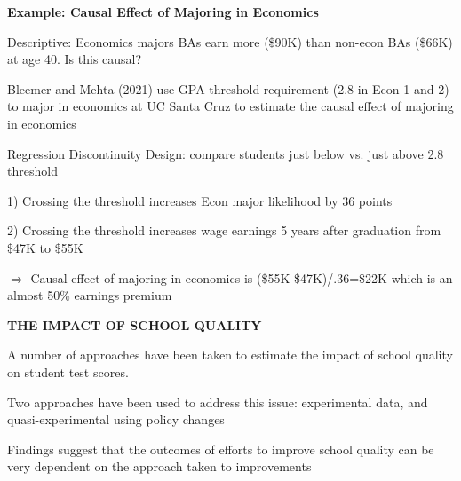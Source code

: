 \documentclass[landscape]{slides}
\begin{document}
\begin{slide}
\begin{center}
{\bf Example: Causal Effect of Majoring in Economics}
\end{center}
Descriptive: Economics majors BAs earn more (\$90K) than non-econ BAs (\$66K) at age 40. Is this causal?

Bleemer and Mehta (2021) use GPA threshold requirement (2.8 in Econ 1 and 2) to major in economics at UC Santa Cruz to
estimate the causal effect of majoring in economics

Regression Discontinuity Design: compare students just below vs. just above 2.8 threshold 

1) Crossing the threshold increases Econ major likelihood by 36 points

2) Crossing the threshold increases wage earnings 5 years after graduation from \$47K to \$55K

$\Rightarrow$ Causal effect of majoring in economics is (\$55K-\$47K)/.36=\$22K which is an almost
50\% earnings premium

\end{slide}


\begin{slide}

\end{slide}


\begin{slide}
\begin{center}
{\bf THE IMPACT OF SCHOOL QUALITY}
\end{center}

A number of approaches have been taken to estimate the impact of school quality on student test scores.

Two approaches have been used to address this issue: experimental data, and quasi-experimental using
policy changes

Findings suggest that the outcomes of efforts to improve school quality can be very dependent on the approach taken to improvements
\end{slide}
\end{document}
